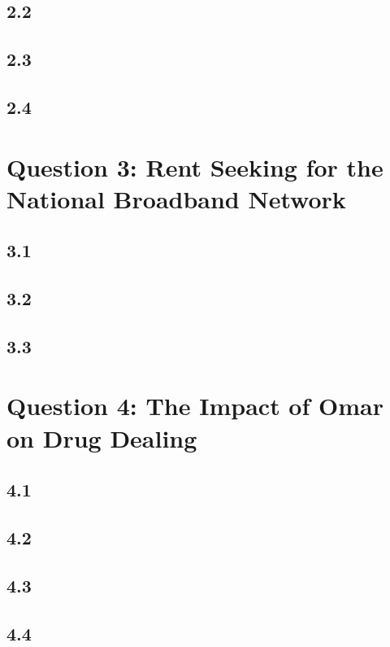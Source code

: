 \documentclass{article}
\begin{document}
\subsection*{2.2}
\subsection*{2.3}
\subsection*{2.4}

\section*{Question 3: Rent Seeking for the National Broadband Network}
\subsection*{3.1}
\subsection*{3.2}
\subsection*{3.3}

\section*{Question 4: The Impact of Omar on Drug Dealing}
\subsection*{4.1}
\subsection*{4.2}
\subsection*{4.3}
\subsection*{4.4}
\end{document}
